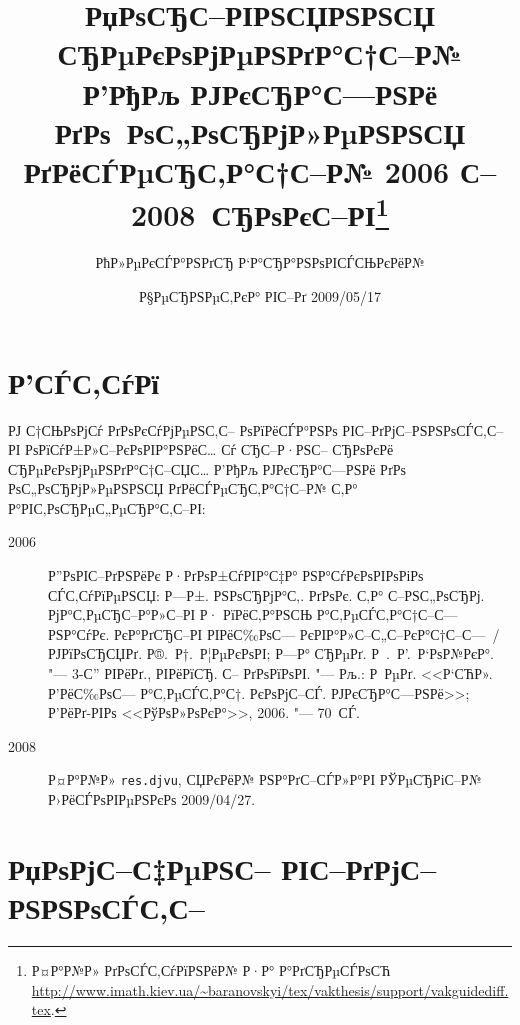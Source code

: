 \documentclass[a4paper]{article}
\begin{document}
\title{РџРѕСЂС–РІРЅСЏРЅРЅСЏ СЂРµРєРѕРјРµРЅРґР°С†С–Р№ Р’РђРљ РЈРєСЂР°С—РЅРё РґРѕ~РѕС„РѕСЂРјР»РµРЅРЅСЏ РґРёСЃРµСЂС‚Р°С†С–Р№ 2006 С– 2008~СЂРѕРєС–РІ\thanks{Р¤Р°Р№Р» РґРѕСЃС‚СѓРїРЅРёР№ Р·Р° Р°РґСЂРµСЃРѕСЋ \protect\url{http://www.imath.kiev.ua/~baranovskyi/tex/vakthesis/support/vakguidediff.tex}.}}
\author{РћР»РµРєСЃР°РЅРґСЂ Р‘Р°СЂР°РЅРѕРІСЃСЊРєРёР№}
\date{Р§РµСЂРЅРµС‚РєР° РІС–Рґ 2009/05/17}

\maketitle


\section{Р’СЃС‚СѓРї}

РЈ С†СЊРѕРјСѓ РґРѕРєСѓРјРµРЅС‚С– РѕРїРёСЃР°РЅРѕ РІС–РґРјС–РЅРЅРѕСЃС‚С– РІ РѕРїСѓР±Р»С–РєРѕРІР°РЅРёС… Сѓ СЂС–Р·РЅС– СЂРѕРєРё
СЂРµРєРѕРјРµРЅРґР°С†С–СЏС… Р’РђРљ РЈРєСЂР°С—РЅРё РґРѕ РѕС„РѕСЂРјР»РµРЅРЅСЏ РґРёСЃРµСЂС‚Р°С†С–Р№ С‚Р° Р°РІС‚РѕСЂРµС„РµСЂР°С‚С–РІ:
\begin{description}
\item[2006] Р”РѕРІС–РґРЅРёРє Р·РґРѕР±СѓРІР°С‡Р° РЅР°СѓРєРѕРІРѕРіРѕ СЃС‚СѓРїРµРЅСЏ: Р—Р±. РЅРѕСЂРјР°С‚. РґРѕРє. С‚Р°
  С–РЅС„РѕСЂРј.  РјР°С‚РµСЂС–Р°Р»С–РІ Р· РїРёС‚Р°РЅСЊ Р°С‚РµСЃС‚Р°С†С–С— РЅР°СѓРє. РєР°РґСЂС–РІ РІРёС‰РѕС—
  РєРІР°Р»С–С„С–РєР°С†С–С—~/ РЈРїРѕСЂСЏРґ. Р®.~Р†.~Р¦РµРєРѕРІ; Р—Р° СЂРµРґ. Р .~Р’.~Р‘РѕР№РєР°. "--- 3-С”
  РІРёРґ., РІРёРїСЂ. С– РґРѕРїРѕРІ. "--- Рљ.: Р РµРґ. <<Р‘СЋР». Р’РёС‰РѕС—
  Р°С‚РµСЃС‚Р°С†. РєРѕРјС–СЃ. РЈРєСЂР°С—РЅРё>>; Р’РёРґ-РІРѕ <<РўРѕР»РѕРєР°>>, 2006. "--- 70~СЃ.

\item[2008] Р¤Р°Р№Р» \texttt{res.djvu}, СЏРєРёР№ РЅР°РґС–СЃР»Р°РІ РЎРµСЂРіС–Р№ Р›РёСЃРѕРІРµРЅРєРѕ
  2009/04/27.
\end{description}

\section{РџРѕРјС–С‡РµРЅС– РІС–РґРјС–РЅРЅРѕСЃС‚С–}
\end{document}
